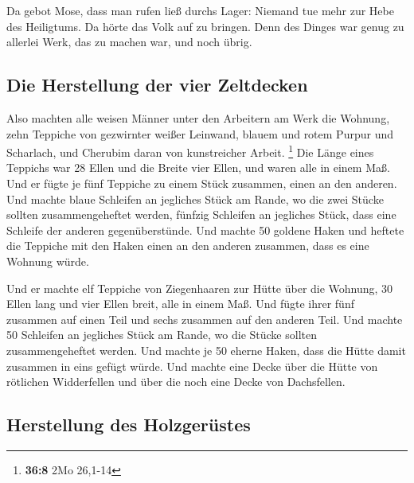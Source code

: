  Da gebot Mose, dass man rufen ließ durchs Lager: Niemand
tue mehr zur Hebe des Heiligtums. Da hörte das Volk auf zu bringen.
 Denn des Dinges war genug zu allerlei Werk, das zu machen
war, und noch übrig.

\hypertarget{die-herstellung-der-vier-zeltdecken}{%
\subsection{Die Herstellung der vier
Zeltdecken}\label{die-herstellung-der-vier-zeltdecken}}

 Also machten alle weisen Männer unter den Arbeitern am
Werk die Wohnung, zehn Teppiche von gezwirnter weißer Leinwand, blauem
und rotem Purpur und Scharlach, und Cherubim daran von kunstreicher
Arbeit. \footnote{\textbf{36:8} 2Mo 26,1-14}  Die Länge
eines Teppichs war 28 Ellen und die Breite vier Ellen, und waren alle in
einem Maß.  Und er fügte je fünf Teppiche zu einem Stück
zusammen, einen an den anderen.  Und machte blaue
Schleifen an jegliches Stück am Rande, wo die zwei Stücke sollten
zusammengeheftet werden,  fünfzig Schleifen an jegliches
Stück, dass eine Schleife der anderen gegenüberstünde. 
Und machte 50 goldene Haken und heftete die Teppiche mit den Haken einen
an den anderen zusammen, dass es eine Wohnung würde.

 Und er machte elf Teppiche von Ziegenhaaren zur Hütte
über die Wohnung,  30 Ellen lang und vier Ellen breit,
alle in einem Maß.  Und fügte ihrer fünf zusammen auf
einen Teil und sechs zusammen auf den anderen Teil.  Und
machte 50 Schleifen an jegliches Stück am Rande, wo die Stücke sollten
zusammengeheftet werden.  Und machte je 50 eherne Haken,
dass die Hütte damit zusammen in eins gefügt würde.  Und
machte eine Decke über die Hütte von rötlichen Widderfellen und über die
noch eine Decke von Dachsfellen.

\hypertarget{herstellung-des-holzgeruxfcstes}{%
\subsection{Herstellung des
Holzgerüstes}\label{herstellung-des-holzgeruxfcstes}}

